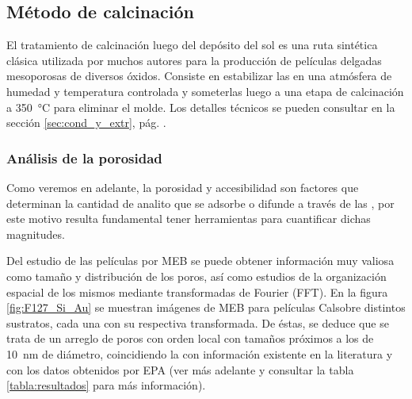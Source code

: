 	  \pagebreak\subsection{Método de calcinación}\label{sub:m_todo_de_calcinaci_n}
	 	
	 		El tratamiento de calcinación luego del depósito del sol es una ruta sintética clásica utilizada por muchos autores para la producción de películas delgadas mesoporosas de diversos óxidos\cite{Soler-Illia2002a,Brinker1999,Soler-Illia2006,Grosso2004,Innocenzi2013,angelome2011}. Consiste en estabilizar las \pdm\space en una atmósfera de humedad y temperatura controlada y someterlas luego a una etapa de calcinación a \SI{350}{\celsius} para eliminar el molde. Los detalles técnicos se pueden consultar en la sección \ref{sec:cond_y_extr}, pág. \pageref{sec:cond_y_extr}.

	 	\subsubsection{Análisis de la porosidad}

		 Como veremos en adelante, la porosidad y accesibilidad son factores que determinan la cantidad de analito que se adsorbe o difunde a través de las \pdm, por este motivo resulta fundamental tener herramientas para cuantificar dichas magnitudes. 

		 Del estudio de las películas por MEB se puede obtener información muy valiosa como tamaño y distribución de los poros, así como estudios de la organización espacial de los mismos mediante transformadas de Fourier (FFT). En la figura \ref{fig:F127_Si_Au} se muestran imágenes de MEB para películas Cal\pdmF\space sobre distintos sustratos, cada una con su respectiva transformada. De éstas, se deduce que se trata de un arreglo de poros con orden local con tamaños próximos a los de \SI{10}{\nm} de diámetro, coincidiendo la con información existente en la literatura\cite{urade2005,angelome2011,lee2006} y con los datos obtenidos por EPA (ver más adelante y consultar la tabla \ref{tabla:resultados} para más información).  

